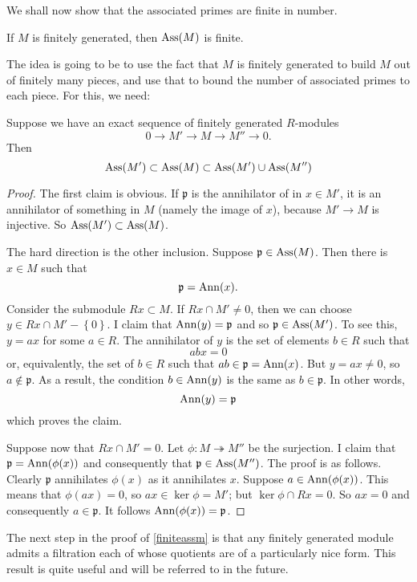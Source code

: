 We shall now show that the associated primes are finite in number.

\begin{proposition} \label{finiteassm}
If $M$ is finitely generated, then $\operatorname{Ass}(M)$ is finite.
\end{proposition}

The idea is going to be to use the fact that $M$ is finitely generated to build
$M$ out of finitely many pieces, and use that to bound the number of associated
primes to each piece. For this, we need:

\begin{lemma} \label{assexact} 
Suppose we have an exact sequence of finitely generated $R$-modules
\[ 0 \to M' \to M \to M'' \to 0.  \]
Then 
\[\operatorname{Ass}(M') \subset \operatorname{Ass}(M) \subset \operatorname{Ass}(M') \cup \operatorname{Ass}(M'')  \]
\end{lemma} 
\begin{proof} 
The first claim is obvious. If $\mathfrak{p}$ is the annihilator of
in $x \in M'$, it is an annihilator of something in $M$ (namely the image of
$x$), because
$M' \to M$ is injective. So $\operatorname{Ass}(M') \subset \operatorname{Ass}(M)$. 

The hard direction is the other inclusion. Suppose $\mathfrak{p} \in \operatorname{Ass}(M)$.
Then there is $x \in M$ such that
\[ \mathfrak{p} = \operatorname{Ann}(x).  \]
Consider the submodule $Rx \subset M$.  If $Rx \cap M' \neq 0$, then we can
choose $y \in Rx \cap M' - \left\{0\right\}$. I claim that $\operatorname{Ann}(y) =
\mathfrak{p}$ and so $\mathfrak{p} \in \operatorname{Ass}(M')$.
To see this, $ y = ax$ for some $a \in R$. The annihilator of $y$ is the set of elements
$b \in R$ such that
\[ abx = 0  \]
or, equivalently, the set of $b \in R$ such that $ab \in \mathfrak{p} =
\operatorname{Ann}(x)$. But $y = ax \neq 0$, so $a \notin \mathfrak{p}$. As a
result, the condition $b \in \operatorname{Ann}(y)$ is the same as $b \in \mathfrak{p}$. In
other words, 
\[ \operatorname{Ann}(y) = \mathfrak{p}  \]
which proves the claim.

Suppose now that  $Rx \cap M' = 0$. Let $\phi: M \twoheadrightarrow M''$
be the surjection. I claim that $\mathfrak{p} = \operatorname{Ann}(\phi(x))$ and
consequently that
$\mathfrak{p} \in \operatorname{Ass}(M'')$.  The proof is as follows. Clearly $\mathfrak{p}$
annihilates $\phi(x)$ as it annihilates $x$. Suppose $a \in \operatorname{Ann}(\phi(x))$.
This means that $\phi(ax) = 0$, so $ax \in \ker \phi=M'$; but $\ker \phi \cap Rx =
0$. So $ax = 0$ and consequently $a \in \mathfrak{p}$. It follows $\operatorname{Ann}(\phi(x)) = \mathfrak{p}$. 
\end{proof} 

The next step in the proof of \cref{finiteassm} is that any
finitely generated module
admits a filtration each of whose quotients are of a particularly nice form.
This result is quite useful and will be referred to in the future.

